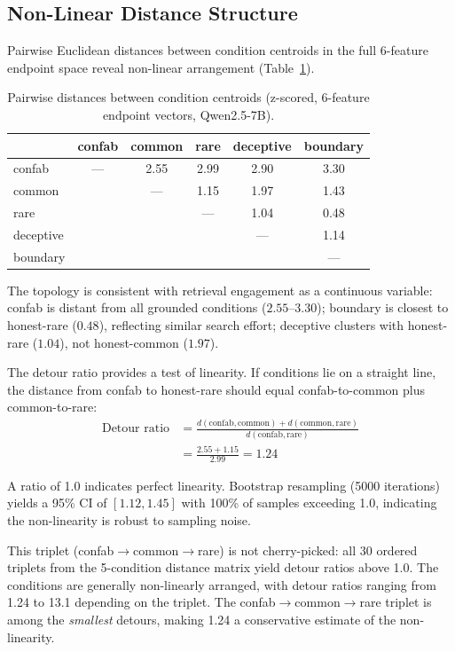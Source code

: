 \documentclass[11pt,a4paper]{article}
\begin{document}
\subsection{Non-Linear Distance Structure}

Pairwise Euclidean distances between condition centroids in the full
6-feature endpoint space reveal non-linear arrangement
(Table~\ref{tab:distance}).

\begin{table}[ht]
\centering
\caption{Pairwise distances between condition centroids (z-scored,
  6-feature endpoint vectors, Qwen2.5-7B).}
\label{tab:distance}
\begin{tabular}{lccccc}
\toprule
 & \textbf{confab} & \textbf{common} & \textbf{rare} & \textbf{deceptive} & \textbf{boundary} \\
\midrule
confab & --- & 2.55 & 2.99 & 2.90 & 3.30 \\
common & & --- & 1.15 & 1.97 & 1.43 \\
rare & & & --- & 1.04 & 0.48 \\
deceptive & & & & --- & 1.14 \\
boundary & & & & & --- \\
\bottomrule
\end{tabular}
\end{table}

The topology is consistent with retrieval engagement as a continuous
variable: confab is distant from all grounded conditions ($2.55$--$3.30$);
boundary is closest to honest-rare ($0.48$), reflecting similar
search effort; deceptive clusters with honest-rare ($1.04$), not
honest-common ($1.97$).

The detour ratio provides a test of linearity. If conditions lie on a
straight line, the distance from confab to honest-rare should equal
confab-to-common plus common-to-rare:
\begin{align*}
\text{Detour ratio} &= \frac{d(\text{confab}, \text{common}) + d(\text{common}, \text{rare})}{d(\text{confab}, \text{rare})} \\
&= \frac{2.55 + 1.15}{2.99} = 1.24
\end{align*}

A ratio of 1.0 indicates perfect linearity. Bootstrap resampling
(5000 iterations) yields a 95\% CI of $[1.12, 1.45]$ with 100\% of
samples exceeding 1.0, indicating the non-linearity is robust to
sampling noise.

This triplet (confab$\to$common$\to$rare) is not cherry-picked: all
30 ordered triplets from the 5-condition distance matrix yield detour
ratios above 1.0. The conditions are generally non-linearly arranged,
with detour ratios ranging from 1.24 to 13.1 depending on the
triplet. The confab$\to$common$\to$rare triplet is among the
\emph{smallest} detours, making 1.24 a conservative estimate of the
non-linearity.
\end{document}
